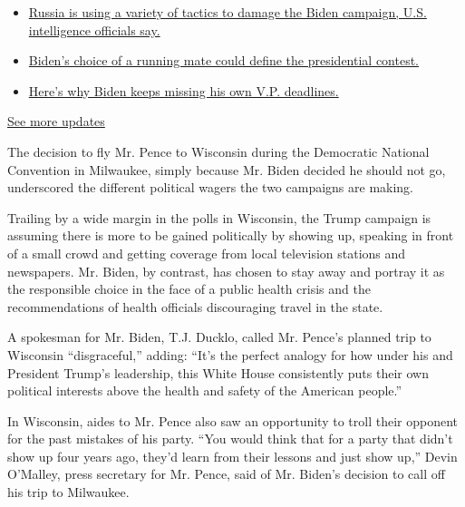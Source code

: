 \begin{itemize}
\tightlist
\item
  \href{https://www.nytimes3xbfgragh.onion/2020/08/07/us/elections/trump-biden.html?action=click\&pgtype=Article\&state=default\&region=MAIN_CONTENT_1\&context=storylines_live_updates\#link-77a72de1}{Russia
  is using a variety of tactics to damage the Biden campaign, U.S.
  intelligence officials say.}
\item
  \href{https://www.nytimes3xbfgragh.onion/2020/08/07/us/elections/trump-biden.html?action=click\&pgtype=Article\&state=default\&region=MAIN_CONTENT_1\&context=storylines_live_updates\#link-1ab01601}{Biden's
  choice of a running mate could define the presidential contest.}
\item
  \href{https://www.nytimes3xbfgragh.onion/2020/08/07/us/elections/trump-biden.html?action=click\&pgtype=Article\&state=default\&region=MAIN_CONTENT_1\&context=storylines_live_updates\#link-4b53533c}{Here's
  why Biden keeps missing his own V.P. deadlines.}
\end{itemize}

\href{https://www.nytimes3xbfgragh.onion/2020/08/07/us/elections/trump-biden.html?action=click\&pgtype=Article\&state=default\&region=MAIN_CONTENT_1\&context=storylines_live_updates}{See
more updates}

The decision to fly Mr. Pence to Wisconsin during the Democratic
National Convention in Milwaukee, simply because Mr. Biden decided he
should not go, underscored the different political wagers the two
campaigns are making.

Trailing by a wide margin in the polls in Wisconsin, the Trump campaign
is assuming there is more to be gained politically by showing up,
speaking in front of a small crowd and getting coverage from local
television stations and newspapers. Mr. Biden, by contrast, has chosen
to stay away and portray it as the responsible choice in the face of a
public health crisis and the recommendations of health officials
discouraging travel in the state.

A spokesman for Mr. Biden, T.J. Ducklo, called Mr. Pence's planned trip
to Wisconsin ``disgraceful,'' adding: ``It's the perfect analogy for how
under his and President Trump's leadership, this White House
consistently puts their own political interests above the health and
safety of the American people.''

In Wisconsin, aides to Mr. Pence also saw an opportunity to troll their
opponent for the past mistakes of his party. ``You would think that for
a party that didn't show up four years ago, they'd learn from their
lessons and just show up,'' Devin O'Malley, press secretary for Mr.
Pence, said of Mr. Biden's decision to call off his trip to Milwaukee.

